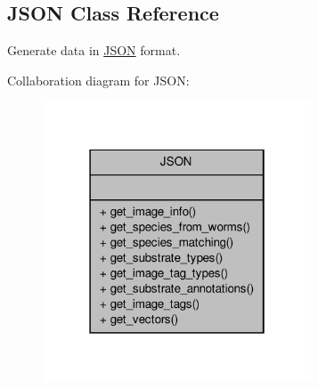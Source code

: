 \hypertarget{classJSON}{\subsection{J\-S\-O\-N Class Reference}
\label{classJSON}
}


Generate data in \hyperlink{classJSON}{J\-S\-O\-N} format.  




Collaboration diagram for J\-S\-O\-N\-:\nopagebreak
\begin{figure}[H]
\begin{center}
\leavevmode
\includegraphics[width=226pt]{classJSON__coll__graph}
\end{center}
\end{figure}
